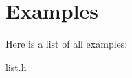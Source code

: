 \section{Examples}
Here is a list of all examples\+:\begin{DoxyCompactItemize}
\item 
\hyperlink{list_8h-example}{list.\+h}
\end{DoxyCompactItemize}

